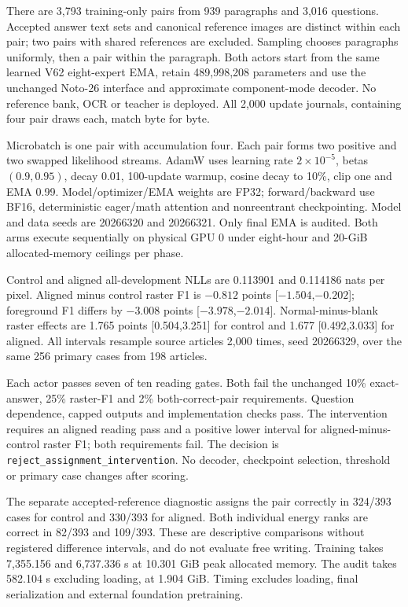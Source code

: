\documentclass[10pt,a4paper]{article}
\begin{document}
There are 3,793 training-only pairs from 939 paragraphs and 3,016 questions.
Accepted answer text sets and canonical reference images are distinct within
each pair; two pairs with shared references are excluded. Sampling chooses
paragraphs uniformly, then a pair within the paragraph. Both actors start
from the same learned V62 eight-expert EMA, retain 489,998,208 parameters and
use the unchanged Noto-26 interface and approximate component-mode decoder.
No reference bank, OCR or teacher is deployed. All 2,000 update journals,
containing four pair draws each, match byte for byte.

Microbatch is one pair with accumulation four. Each pair forms two positive
and two swapped likelihood streams. AdamW uses learning rate $2\times10^{-5}$,
betas $(0.9,0.95)$, decay 0.01, 100-update warmup, cosine decay to 10\%, clip
one and EMA 0.99. Model/optimizer/EMA weights are FP32; forward/backward use
BF16, deterministic eager/math attention and nonreentrant checkpointing.
Model and data seeds are 20266320 and 20266321. Only final EMA is audited.
Both arms execute sequentially on physical GPU 0 under eight-hour and
20-GiB allocated-memory ceilings per phase.


Control and aligned all-development NLLs are 0.113901 and 0.114186 nats per
pixel. Aligned minus control raster F1 is $-0.812$ points [$-1.504$,$-0.202$];
foreground F1 differs by $-3.008$ points [$-3.978$,$-2.014$]. Normal-minus-blank
raster effects are 1.765 points [0.504,3.251] for control and 1.677
[0.492,3.033] for aligned. All intervals resample source articles 2,000 times,
seed 20266329, over the same 256 primary cases from 198 articles.

Each actor passes seven of ten reading gates. Both fail the unchanged 10\%
exact-answer, 25\% raster-F1 and 2\% both-correct-pair requirements. Question
dependence, capped outputs and implementation checks pass. The intervention
requires an aligned reading pass and a positive lower interval for
aligned-minus-control raster F1; both requirements fail. The decision is
\texttt{reject\_assignment\_intervention}. No decoder, checkpoint selection,
threshold or primary case changes after scoring.

The separate accepted-reference diagnostic assigns the pair correctly in
324/393 cases for control and 330/393 for aligned. Both individual energy
ranks are correct in 82/393 and 109/393. These are descriptive comparisons
without registered difference intervals, and do not evaluate free writing.
Training takes 7,355.156 and 6,737.336 s at 10.301 GiB peak allocated memory.
The audit takes 582.104 s excluding loading, at 1.904 GiB. Timing excludes
loading, final serialization and external foundation pretraining.
\end{document}
